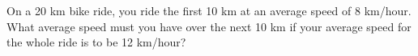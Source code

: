 On a 20 km bike ride, you ride the first 10 km at an average
speed of 8 km/hour. What  average speed must you have over the next 10 km
if your average speed for the whole ride is to be 12 km/hour?
